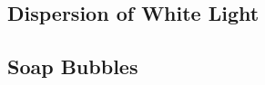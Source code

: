 \begin{multicols}{2}
\vfill
\columnbreak


%
%
%
%


\section*{Dispersion of White Light}


\subsection{Soap Bubbles}


\end{multicols}

